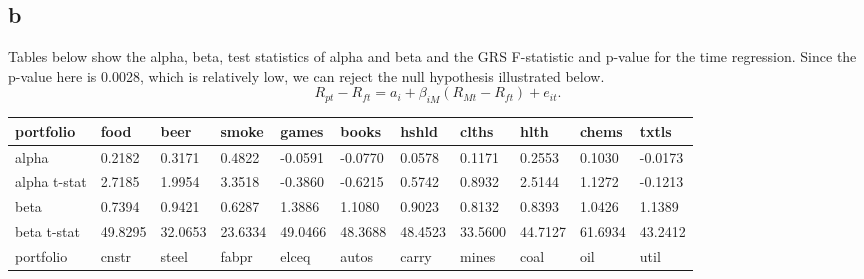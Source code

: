 \documentclass{report}
\begin{document}
\subsection{b}
Tables below show the alpha, beta, test statistics of alpha and beta and the GRS F-statistic and p-value for the time regression. Since the p-value here is 0.0028, which is relatively low, we can reject the null hypothesis illustrated below.
\[ R_{pt}-R_{ft} = a_{i}+\beta_{iM}(R_{Mt}-R_{ft})+e_{it}.\]
\begin{table}[H]
\begin{tabular}{@{}|l|llllllllll@{}}
\toprule
portfolio    & \multicolumn{1}{l|}{food}  & \multicolumn{1}{l|}{beer}  & \multicolumn{1}{l|}{smoke} & \multicolumn{1}{l|}{games} & \multicolumn{1}{l|}{books} & \multicolumn{1}{l|}{hshld} & \multicolumn{1}{l|}{clths} & \multicolumn{1}{l|}{hlth}  & \multicolumn{1}{l|}{chems} & \multicolumn{1}{l|}{txtls} \\ \midrule
alpha        & 0.2182                     & 0.3171                     & 0.4822                     & -0.0591                    & -0.0770                    & 0.0578                     & 0.1171                     & 0.2553                     & 0.1030                     & -0.0173                    \\ \cmidrule(r){1-1}
alpha t-stat & 2.7185                     & 1.9954                     & 3.3518                     & -0.3860                    & -0.6215                    & 0.5742                     & 0.8932                     & 2.5144                     & 1.1272                     & -0.1213                    \\ \cmidrule(r){1-1}
beta         & 0.7394                     & 0.9421                     & 0.6287                     & 1.3886                     & 1.1080                     & 0.9023                     & 0.8132                     & 0.8393                     & 1.0426                     & 1.1389                     \\ \cmidrule(r){1-1}
beta t-stat  & 49.8295                    & 32.0653                    & 23.6334                    & 49.0466                    & 48.3688                    & 48.4523                    & 33.5600                    & 44.7127                    & 61.6934                    & 43.2412                    \\ \midrule
portfolio    & \multicolumn{1}{l|}{cnstr} & \multicolumn{1}{l|}{steel} & \multicolumn{1}{l|}{fabpr} & \multicolumn{1}{l|}{elceq} & \multicolumn{1}{l|}{autos} & \multicolumn{1}{l|}{carry} & \multicolumn{1}{l|}{mines} & \multicolumn{1}{l|}{coal}  & \multicolumn{1}{l|}{oil}   & \multicolumn{1}{l|}{util}  \\ \midrule

\end{tabular}
\end{table}
\end{document}
